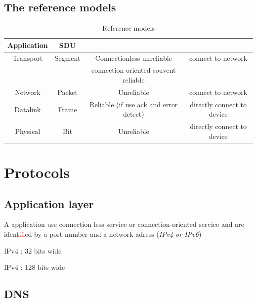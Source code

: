 \subsection{The reference models}


\begin{table}[h]
    \begin{tabular}{|c|c|c|c|}
        \hline
        Application & SDU     &                                        &  \\
        \hline
        Transport   & Segment & Connectionless unreliable              & connect to network  \\
                    &         & connection-oriented souvent reliable   & \\
        \hline
        Network     & Packet  & Unreliable                             & connect to network \\
        \hline
        Datalink    & Frame   & Reliable (if use ack and error detect) & directly connect to device \\
        \hline
        Physical    & Bit     & Unreliable                             & directly connect to device \\
        \hline
    \end{tabular}
    \caption{Reference models}
\end{table}

\section{Protocols}

\subsection{Application layer}
A application use connection less service or connection-oriented service
and are ident\textcolor{red}{if}ied by a port number and a network adress (\textit{IPv4 or IPv6})

\begin{description}
    \item IPv4 : 32 bits wide
    \item IPv4 : 128 bits wide
\end{description}

\subsection{DNS}

